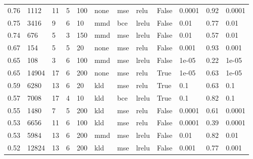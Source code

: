 \begin{longtable}{llllllllllll}
           0.76 &         1112 &             11 &        5 &              100 &        none &                 mse &                relu &     False &  0.0001 &      0.92 & 0.0001 \\
           0.75 &         3416 &              9 &        6 &               10 &         mmd &                 bce &               lrelu &     False &    0.01 &      0.77 &   0.01 \\
           0.74 &          676 &              5 &        3 &              150 &         mmd &                 mse &               lrelu &     False &    0.01 &      0.57 &   0.01 \\
           0.67 &          154 &              5 &        5 &               20 &        none &                 mse &                relu &     False &   0.001 &      0.93 &  0.001 \\
           0.65 &          108 &              3 &        6 &              100 &         mmd &                 mse &               lrelu &     False &   1e-05 &      0.22 &  1e-05 \\
           0.65 &        14904 &             17 &        6 &              200 &        none &                 mse &                relu &      True &   1e-05 &      0.63 &  1e-05 \\
           0.59 &         6280 &             13 &        6 &               20 &         kld &                 mse &                relu &      True &     0.1 &      0.63 &    0.1 \\
           0.57 &         7008 &             17 &        4 &               10 &         kld &                 bce &               lrelu &      True &     0.1 &      0.82 &    0.1 \\
           0.55 &         1480 &              7 &        5 &              200 &         kld &                 mse &                relu &     False &  0.0001 &      0.61 & 0.0001 \\
           0.53 &         6656 &             11 &        6 &              100 &         kld &                 mse &                relu &     False &  0.0001 &      0.39 & 0.0001 \\
           0.53 &         5984 &             13 &        6 &              200 &         mmd &                 mse &               lrelu &     False &    0.01 &      0.82 &   0.01 \\
           0.52 &        12824 &             13 &        6 &              200 &         kld &                 mse &               lrelu &     False &   0.001 &      0.77 &  0.001 \\

\end{longtable}
